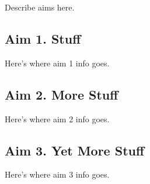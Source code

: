 \documentclass[../main.tex]{subfiles}
\begin{document}
Describe aims here.

\subsection{Aim 1. Stuff}
Here's where aim 1 info goes.

\subsection{Aim 2. More Stuff}
Here's where aim 2 info goes.

\subsection{Aim 3. Yet More Stuff}
Here's where aim 3 info goes.
\end{document}
